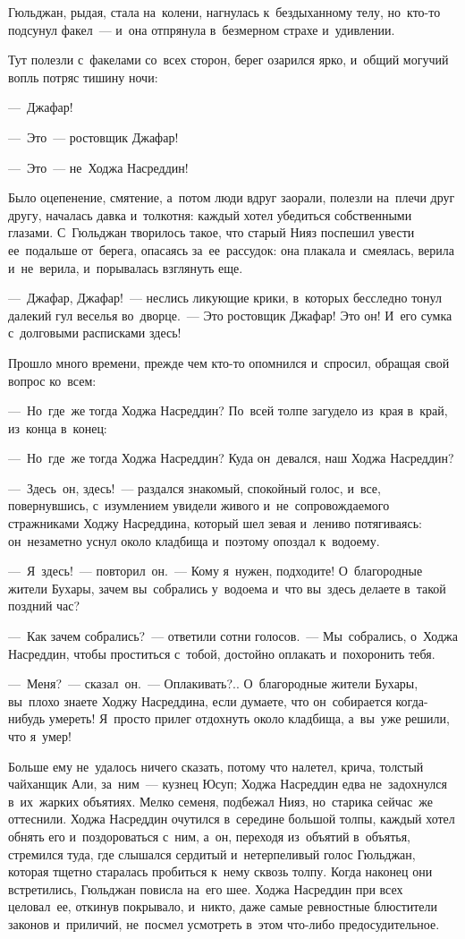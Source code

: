 \documentclass[12pt,a4paper]{book}
\begin{document}
Гюльджан, рыдая, стала на~колени, нагнулась к~бездыханному телу, но~кто-то подсунул факел~— и~она отпрянула в~безмерном страхе и~удивлении.

Тут полезли с~факелами со~всех сторон, берег озарился ярко, и~общий могучий вопль потряс тишину ночи:

—~Джафар!

—~Это~— ростовщик Джафар!

—~Это~— не~Ходжа Насреддин!

Было оцепенение, смятение, а~потом люди вдруг заорали, полезли на~плечи друг другу, началась давка и~толкотня: каждый хотел убедиться собственными глазами. С~Гюльджан творилось такое, что старый Нияз поспешил увести ее~подальше от~берега, опасаясь за~ее~рассудок: она плакала и~смеялась, верила и~не~верила, и~порывалась взглянуть еще.

—~Джафар, Джафар!~— неслись ликующие крики, в~которых бесследно тонул далекий гул веселья во~дворце.~— Это ростовщик Джафар! Это он! И~его сумка с~долговыми расписками здесь!

Прошло много времени, прежде чем кто-то опомнился и~спросил, обращая свой вопрос ко~всем:

—~Но~где~же тогда Ходжа Насреддин? По~всей толпе загудело из~края в~край, из~конца в~конец:

—~Но~где~же тогда Ходжа Насреддин? Куда он~девался, наш Ходжа Насреддин?

—~Здесь~он, здесь!~— раздался знакомый, спокойный голос, и~все, повернувшись, с~изумлением увидели живого и~не~сопровождаемого стражниками Ходжу Насреддина, который шел зевая и~лениво потягиваясь: он~незаметно уснул около кладбища и~поэтому опоздал к~водоему.

—~Я~здесь!~— повторил~он.~— Кому я~нужен, подходите! О~благородные жители Бухары, зачем вы~собрались у~водоема и~что вы~здесь делаете в~такой поздний час?

—~Как зачем собрались?~— ответили сотни голосов.~— Мы~собрались, о~Ходжа Насреддин, чтобы проститься с~тобой, достойно оплакать и~похоронить тебя.

—~Меня?~— сказал~он.~— Оплакивать?.. О~благородные жители Бухары, вы~плохо знаете Ходжу Насреддина, если думаете, что он~собирается когда-нибудь умереть! Я~просто прилег отдохнуть около кладбища, а~вы~уже решили, что я~умер!

Больше ему не~удалось ничего сказать, потому что налетел, крича, толстый чайханщик Али, за~ним~— кузнец Юсуп; Ходжа Насреддин едва не~задохнулся в~их~жарких объятиях. Мелко семеня, подбежал Нияз, но~старика сейчас~же оттеснили. Ходжа Насреддин очутился в~середине большой толпы, каждый хотел обнять его и~поздороваться с~ним, а~он, переходя из~объятий в~объятья, стремился туда, где слышался сердитый и~нетерпеливый голос Гюльджан, которая тщетно старалась пробиться к~нему сквозь толпу. Когда наконец они встретились, Гюльджан повисла на~его шее. Ходжа Насреддин при всех целовал~ее, откинув покрывало, и~никто, даже самые ревностные блюстители законов и~приличий, не~посмел усмотреть в~этом что-либо предосудительное.
\end{document}
